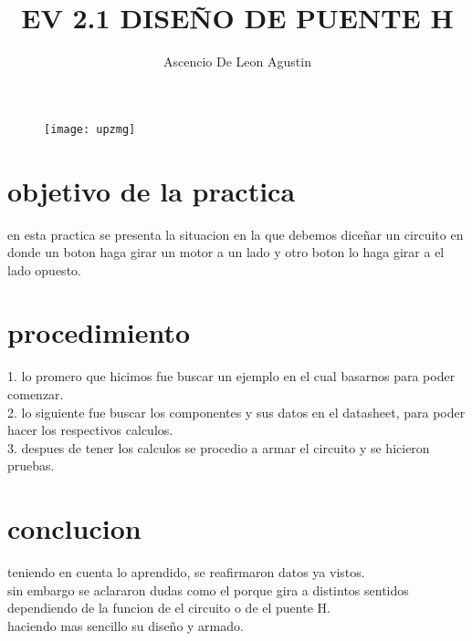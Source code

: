 \documentclass[14pt,letterpaper]{article}
\title{EV 2.1 DISEÑO DE PUENTE H}
\author{Ascencio De Leon Agustin}
\begin{document}
\maketitle
\begin{figure}[h!]
\centering
\texttt{[image: upzmg]}
\end{figure}
\newpage
\section{objetivo de la practica}
en esta practica se presenta la situacion en la que debemos diceñar un circuito en donde un boton haga girar un motor a un lado y otro boton lo haga girar a el lado opuesto.\\
\section{procedimiento}
1. lo promero que hicimos fue buscar un ejemplo en el cual basarnos para poder comenzar.\\
2. lo siguiente fue buscar los componentes y sus datos en el datasheet, para poder hacer los respectivos calculos.\\
3. despues de tener los calculos se procedio a armar el circuito y se hicieron pruebas.
\section{conclucion}
teniendo en cuenta lo aprendido, se reafirmaron datos ya vistos.\\
sin embargo se aclararon dudas como el porque gira a distintos sentidos dependiendo de la funcion de el circuito o de el puente H.\\
haciendo mas sencillo su diseño y armado.\\ 
\end{document}
